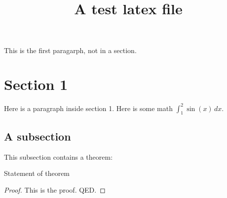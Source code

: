 \documentclass{article}
\begin{document}
\title{A test latex file}

This is the first paragarph, not in a section.

\section{Section 1}

Here is a paragraph inside section 1.  Here is some math $\int_1^2 \sin(x)\, dx$.

\subsection{A subsection}

This subsection contains a theorem:

\begin{theorem}
Statement of theorem
\end{theorem}

\begin{proof}
This is the proof.  QED.
\end{proof}
\end{document}
